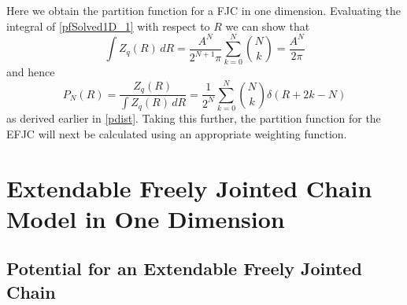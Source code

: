 %
Here we obtain the partition function for a FJC in one dimension. Evaluating the integral of \eqref{pfSolved1D_1} with respect to $R$ we can show that
%
\begin{equation}
\int Z_{q}\left(R\right)\,dR = \frac{A^{N}}{2^{N+1}\pi}\sum_{k=0}^{N}\binom{N}{k}= \frac{A^{N}}{2\pi} 
\end{equation}
%
and hence
%
\begin{equation}
P_{N}\left(R\right) = \frac{Z_{q}\left(R\right)}{\int Z_{q}\left(R\right)\,dR} = \frac{1}{2^{N}}\sum^{N}_{k=0}\binom{N}{k}\delta(R+2k-N)
\end{equation}
%
as derived earlier in \eqref{pdist}. Taking this further, the partition function for the EFJC will next be calculated using an appropriate weighting function.

\section{Extendable Freely Jointed Chain Model in One Dimension}

\subsection{Potential for an Extendable Freely Jointed Chain}


